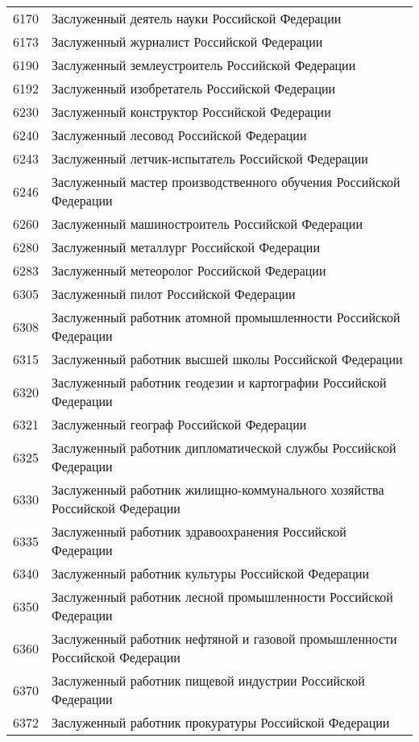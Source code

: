 \documentclass[10pt, a4paper, titlepage]{article}
\begin{document}
\begin{center}
\begin{longtable}{rp{}}
        6170 & Заслуженный деятель науки Российской Федерации \\
        6173 & Заслуженный журналист Российской Федерации \\
        6190 & Заслуженный землеустроитель Российской Федерации \\
        6192 & Заслуженный изобретатель Российской Федерации \\
        6230 & Заслуженный конструктор Российской Федерации \\
        6240 & Заслуженный лесовод Российской Федерации \\
        6243 & Заслуженный летчик-испытатель Российской Федерации \\
        6246 & Заслуженный мастер производственного обучения Российской Федерации \\
        6260 & Заслуженный машиностроитель Российской Федерации \\
        6280 & Заслуженный металлург Российской Федерации \\
        6283 & Заслуженный метеоролог Российской Федерации \\
        6305 & Заслуженный пилот Российской Федерации \\
        6308 & Заслуженный работник атомной промышленности Российской Федерации \\
        6315 & Заслуженный работник высшей школы Российской Федерации \\
        6320 & Заслуженный работник геодезии и картографии Российской Федерации \\
        6321 & Заслуженный географ Российской Федерации \\
        6325 & Заслуженный работник дипломатической службы Российской Федерации \\
        6330 & Заслуженный работник жилищно-коммунального хозяйства Российской Федерации \\
        6335 & Заслуженный работник здравоохранения Российской Федерации \\
        6340 & Заслуженный работник культуры Российской Федерации \\
        6350 & Заслуженный работник лесной промышленности Российской Федерации \\
        6360 & Заслуженный работник нефтяной и газовой промышленности Российской Федерации \\
        6370 & Заслуженный работник пищевой индустрии Российской Федерации \\
        6372 & Заслуженный работник прокуратуры Российской Федерации \\

\end{longtable}
\end{center}
\end{document}
